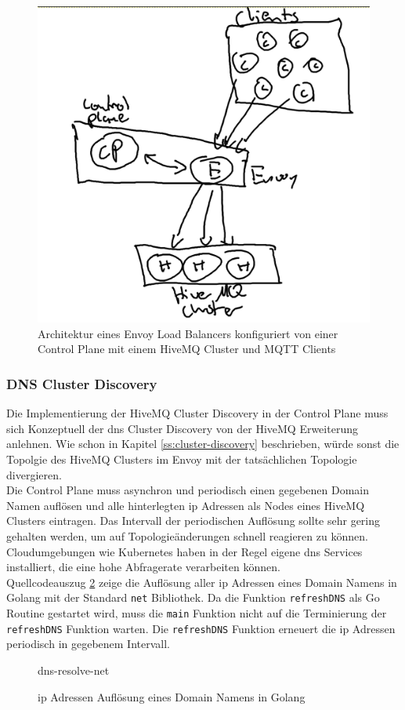 \begin{figure}
    \centering
    \includegraphics[scale=0.5]{images/control-plane-architecture.png}
    \caption{Architektur eines Envoy Load Balancers konfiguriert von einer Control Plane mit einem HiveMQ Cluster und MQTT Clients}
    \label{fig:control-plane-architecture}
\end{figure}

\subsubsection{DNS Cluster Discovery} \label{ss:dns-discovery}
Die Implementierung der HiveMQ Cluster Discovery in der Control Plane muss sich Konzeptuell der \ac{dns} Cluster Discovery von der HiveMQ Erweiterung anlehnen. Wie schon in Kapitel \ref{ss:cluster-discovery} beschrieben, würde sonst die Topolgie des HiveMQ Clusters im Envoy mit der tatsächlichen Topologie divergieren.
\\
Die Control Plane muss asynchron und periodisch einen gegebenen Domain Namen auflösen und alle hinterlegten \ac{ip} Adressen als Nodes eines HiveMQ Clusters eintragen. Das Intervall der periodischen Auflösung sollte sehr gering gehalten werden, um auf Topologieänderungen schnell reagieren zu können.
Cloudumgebungen wie Kubernetes haben in der Regel eigene \ac{dns} Services installiert, die eine hohe Abfragerate verarbeiten können.
\\
Quellcodeauszug \ref{code:dns-resolve-net} zeige die Auflösung aller \ac{ip} Adressen eines Domain Namens in Golang mit der Standard \verb|net| Bibliothek. Da die Funktion \verb|refreshDNS| als Go Routine gestartet wird, muss die \verb|main| Funktion nicht auf die Terminierung der \verb|refreshDNS| Funktion warten. Die \verb|refreshDNS| Funktion erneuert die \ac{ip} Adressen periodisch in gegebenem Intervall.
\begin{figure}
    {dns-resolve-net}
    \caption{\ac{ip} Adressen Auflösung eines Domain Namens in Golang}
    \label{code:dns-resolve-net}
\end{figure}

